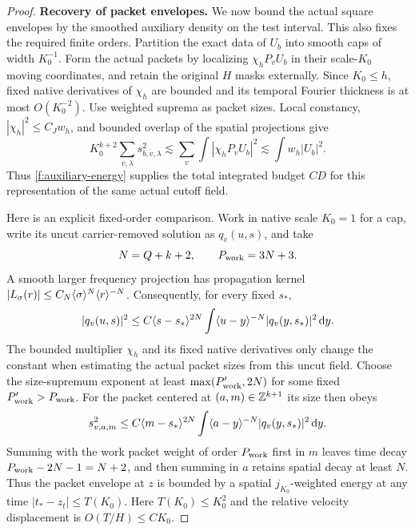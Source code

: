 \begin{proof}
\smallskip\noindent\textbf{Recovery of packet envelopes.}
We now bound the actual square envelopes by the smoothed auxiliary
density on the test interval. This also fixes the required finite
orders. Partition the exact data of $U_b$
into smooth caps of width $K_0^{-1}$. Form the actual packets by
localizing $\chi_h P_vU_b$ in their scale-$K_0$ moving coordinates,
and retain the original $H$ masks externally. Since $K_0\le h$, fixed
native derivatives of $\chi_h$ are bounded and its temporal Fourier
thickness is at most $O(K_0^{-2})$. Use weighted suprema as packet
sizes. Local constancy, $|\chi_h|^2\le C_Jw_h$, and bounded overlap
of the spatial projections give
\begin{equation}\label{f:actual-packet-energy}
 K_0^{k+2}\sum_{v,\lambda}s_{b,v,\lambda}^2
 \lesssim\sum_v\int|\chi_hP_vU_b|^2
 \lesssim\int w_h|U_b|^2.
\end{equation}
Thus \eqref{f:auxiliary-energy} supplies the total integrated budget
$CD$ for this representation of the same actual cutoff field.

Here is an explicit fixed-order comparison. Work in native scale
$K_0=1$ for a cap, write its uncut carrier-removed solution as $q_v(u,s)$,
and take
\[
 N=Q+k+2,\qquad P_{\rm work}=3N+3.
\]
A smooth larger frequency projection has propagation kernel
$|L_\sigma(r)|\le C_N\langle \sigma\rangle^{N}\langle r\rangle^{-N}$.
Consequently, for every fixed $s_*$,
\[
 |q_v(u,s)|^2\le C\langle s-s_*\rangle^{2N}
        \int\langle u-y\rangle^{-N}|q_v(y,s_*)|^2\,\mathrm d y.
\]
The bounded multiplier $\chi_h$ and its fixed native derivatives only
change the constant when estimating the actual packet sizes from this
uncut field. Choose the size-supremum exponent at least
$\max(P'_{\rm work},2N)$ for some fixed
$P'_{\rm work}>P_{\rm work}$. For the packet centered at
$(a,m)\in\mathbb Z^{k+1}$ its size then obeys
\[
 s_{v,a,m}^2\le C\langle m-s_*\rangle^{2N}
              \int\langle a-y\rangle^{-N}|q_v(y,s_*)|^2\,\mathrm d y.
\]
Summing with the work packet weight of order $P_{\rm work}$ first in $m$
leaves time decay $P_{\rm work}-2N-1=N+2$, and then summing in $a$
retains spatial decay at least $N$. Thus the packet envelope at $z$
is bounded by a spatial $j_{K_0}$-weighted energy at any time
$|t_*-z_t|\le T(K_0)$. Here $T(K_0)\le K_0^2$ and the relative
velocity displacement is $O(T/H)\le CK_0$.


\end{proof}
